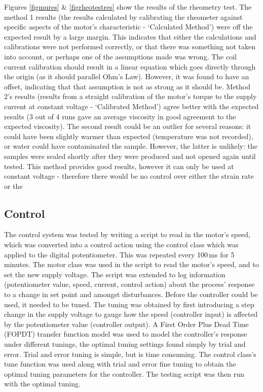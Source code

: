 \documentclass[twoside,a4]{report}
\def\br{\newline \newline \noindent}
\begin{document}
	Figures \ref{figmures} \& \ref{figrheotestres} show the results of the rheometry test. The method 1 results (the results calculated by calibrating the rheometer against specific aspects of the motor's characteristic - `Calculated Method') were off the expected result by a large margin. This indicates that either the calculations and calibrations were not performed correctly, or that there was something not taken into account, or perhaps one of the assumptions made was wrong. The coil current calibration should result in a linear equation which goes directly through the origin (as it should parallel Ohm's Law). However, it was found to have an offset, indicating that that assumption is not as strong as it should be.
	\br
	Method 2's results (results from a straight calibration of the motor's torque to the supply current at constant voltage - `Calibrated Method') agree better with the expected results (3 out of 4 runs gave an average viscosity in good agreement to the expected viscosity). The second result could be an outlier for several reasons: it could have been slightly warmer than expected (temperature was not recorded), or water could have contaminated the sample. However, the latter is unlikely: the samples were sealed shortly after they were produced and not opened again until tested. This method provides good results, however it can only be used at constant voltage - therefore there would be no control over either the strain rate or the 
	
	\subsection*{Control}
	The control system was tested by writing a script to read in the motor's speed, which was converted into a control action using the control class which was applied to the digital potentiometer. This was repeated every 100\,ms for 5 minutes. The motor class was used in the script to read the motor's speed, and to set the new supply voltage. The script was extended to log information (potentiometer value, speed, current, control action) about the process' response to a change in set point and amongst disturbances.
	\br
	Before the controller could be used, it needed to be tuned. The tuning was obtained by first introducing a step change in the supply voltage to gauge how the speed (controller input) is affected by the potentiometer value (controller output). A First Order Plus Dead Time (FOPDT) transfer function model was used to model the controller's response under different tunings, the optimal tuning settings found simply by trial and error.
	\br
	Trial and error tuning is simple, but is time consuming. The control class's tune function was used along with trial and error fine tuning to obtain the optimal tuning parameters for the controller. The testing script was then run with the optimal tuning.
	\newline
	
\end{document}
